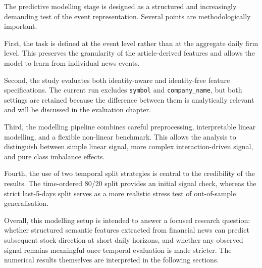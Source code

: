 The predictive modelling stage is designed as a structured and increasingly demanding test of the event representation. Several points are methodologically important.

First, the task is defined at the event level rather than at the aggregate daily firm level. This preserves the granularity of the article-derived features and allows the model to learn from individual news events.

Second, the study evaluates both identity-aware and identity-free feature specifications. The current run excludes \texttt{symbol} and \texttt{company\_name}, but both settings are retained because the difference between them is analytically relevant and will be discussed in the evaluation chapter.

Third, the modelling pipeline combines careful preprocessing, interpretable linear modelling, and a flexible non-linear benchmark. This allows the analysis to distinguish between simple linear signal, more complex interaction-driven signal, and pure class imbalance effects.

Fourth, the use of two temporal split strategies is central to the credibility of the results. The time-ordered 80/20 split provides an initial signal check, whereas the strict last-5-days split serves as a more realistic stress test of out-of-sample generalisation.

Overall, this modelling setup is intended to answer a focused research question: whether structured semantic features extracted from financial news can predict subsequent stock direction at short daily horizons, and whether any observed signal remains meaningful once temporal evaluation is made stricter. The numerical results themselves are interpreted in the following sections.
